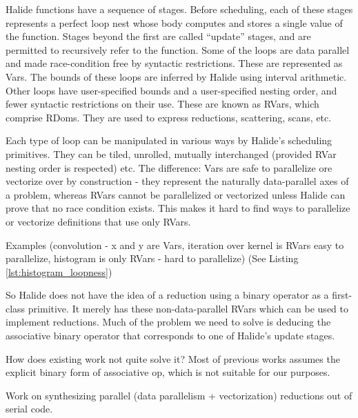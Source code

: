 Halide functions have a sequence of stages. Before scheduling, each of these stages represents a perfect loop nest whose body computes and stores a single value of the function. Stages beyond the first are called ``update'' stages, and are permitted to recursively refer to the function. Some of the loops are data parallel and made race-condition free by syntactic restrictions. These are represented as Vars. The bounds of these loops are inferred by Halide using interval arithmetic. Other loops have user-specified bounds and a user-specified nesting order, and fewer syntactic restrictions on their use. These are known as RVars, which comprise RDoms. They are used to express reductions, scattering, scans, etc. 

Each type of loop can be manipulated in various ways by Halide's scheduling primitives. They can be tiled, unrolled, mutually interchanged (provided RVar nesting order is respected) etc. The difference: Vars are safe to parallelize ore vectorize over by construction - they represent the naturally data-parallel axes of a problem, whereas RVars cannot be parallelized or vectorized unless Halide can prove that no race condition exists. This makes it hard to find ways to parallelize or vectorize definitions that use only RVars.

Examples (convolution - x and y are Vars, iteration over kernel is RVars easy to parallelize, histogram is only RVars - hard to parallelize) (See Listing \ref{lst:histogram_loopness})

So Halide does not have the idea of a reduction using a binary operator as a first-class primitive. It merely has these non-data-parallel RVars which can be used to implement reductions. Much of the problem we need to solve is deducing the associative binary operator that corresponds to one of Halide's update stages.

How does existing work not quite solve it? Most of previous works assumes the explicit binary form of associative op, which is not suitable for our purposes.

Work on synthesizing parallel (data parallelism + vectorization) reductions out of serial code. \\


